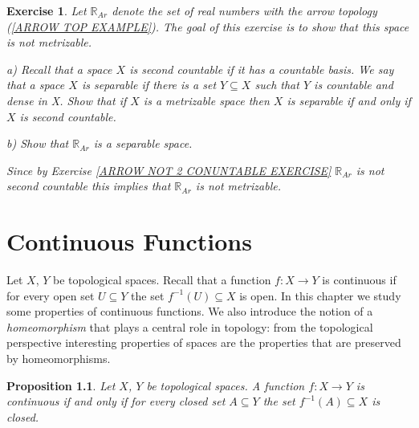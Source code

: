 \documentclass[11pt, letterpaper, oneside]{report}
\renewcommand{\chaptermark}[1]{\markboth{#1}{}}
\theoremstyle{pplain}
\newtheorem{proposition}[theorem]{Proposition}
\newtheorem{ITERMVALUE THM}[theorem]{Intermediate Value Theorem}
\newtheorem{HEINEBOREL THM}[theorem]{Heine-Borel Theorem}
\newtheorem{UMETR THM}[theorem]{Urysohn Metrization Theorem}
\newtheorem{UMETR2 THM}[theorem]{Urysohn Metrization Theorem (v.2)}
\theoremstyle{ddefinition}
\theoremstyle{nnn}
\newtheorem{TDA NN}[theorem]{Topological Data Analysis. }
\theoremstyle{eexercise}
\newtheorem{exercise}{Exercise}[chapter]
\newcommand{\R}{{\mathbb R}}
\begin{document}
\begin{exercise}
\label{ARROW NOT METRIZABLE EXERCISE}
 Let $\R_{Ar}$ denote the set of real numbers with the arrow topology (\ref{ARROW TOP EXAMPLE}).
The goal of this exercise is to show that this space is not metrizable. 

a) Recall that a space $X$ is second countable if it has a countable basis. 
We say that a space $X$ is \emph{separable} if there is a set $Y\subseteq X$ such that $Y$ is countable and 
dense in X. Show that if $X$ is a metrizable space then  $X$ is separable if and only if $X$ is second countable.

b) Show that $\R_{Ar}$ is a separable space. 

Since  by Exercise \ref{ARROW NOT 2 CONUNTABLE EXERCISE} $\R_{Ar}$ is not second countable
 this implies that $\R_{Ar}$ is not metrizable. 
\end{exercise}






\newpage

\chapter{Continuous Functions}
\chaptermark{Continuous Functions}

\thispagestyle{firststyle}



Let $X$, $Y$ be topological spaces. Recall that a function $f\colon X\to Y$ is continuous 
if for every open set $U\subseteq Y$ the set $f^{-1}(U)\subseteq X$ is open. In this chapter 
we study some properties of continuous functions. We also introduce the notion of a 
\emph{homeomorphism} that plays a central role in topology: from the topological 
perspective interesting properties of spaces are the properties that are preserved by homeomorphisms.  

 \begin{proposition}
 \label{CONT VIA CLOSED PROP}
 Let $X$, $Y$ be topological spaces. A function $f\colon X\to Y$ is continuous if and only if
 for every closed set $A\subseteq Y$ the set $f^{-1}(A)\subseteq X$ is closed.  
 \end{proposition}
 
\end{document}

